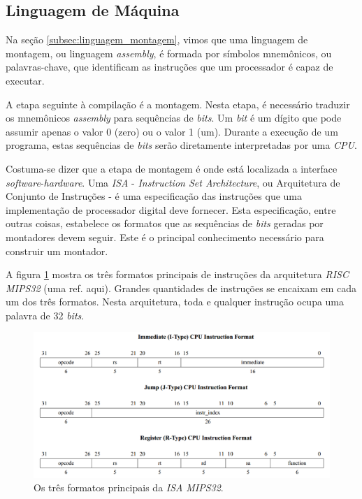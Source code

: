 \subsection{Linguagem de Máquina}
\label{subsec:linguagem_maquina}

Na seção \ref{subsec:linguagem_montagem}, vimos que uma linguagem de montagem,
ou linguagem \textit{assembly}, é formada por símbolos mnemônicos, ou
palavras-chave, que identificam as instruções que um processador é capaz de
executar.

A etapa seguinte à compilação é a montagem. Nesta etapa, é necessário traduzir
os mnemônicos \textit{assembly} para sequências de \textit{bits}. Um
\textit{bit} é um dígito que pode assumir apenas o valor 0 (zero) ou o valor 1
(um). Durante a execução de um programa, estas sequências de \textit{bits} serão
diretamente interpretadas por uma \textit{CPU}.

Costuma-se dizer que a etapa de montagem é onde está localizada a interface
\textit{software}-\textit{hardware}. Uma \textit{ISA} - \textit{Instruction Set
Architecture}, ou Arquitetura de Conjunto de Instruções - é uma especificação
das instruções que uma implementação de processador digital deve fornecer. Esta
especificação, entre outras coisas, estabelece os formatos que as sequências de
\textit{bits} geradas por montadores devem seguir. Este é o principal
conhecimento necessário para construir um montador.

A figura \ref{instrucoes_mips} mostra os três formatos principais de instruções
da arquitetura \textit{RISC} \textit{MIPS32} (uma ref. aqui). Grandes
quantidades de instruções se encaixam em cada um dos três formatos. Nesta
arquitetura, toda e qualquer instrução ocupa uma palavra de 32 \textit{bits}.

\begin{figure}[ptb]
  \begin{center}
    \includegraphics[scale=.35]{imagens/instrucoes_mips}
  \end{center}
  \caption{Os três formatos principais da \textit{ISA} \textit{MIPS32}.}
  \label{instrucoes_mips}
\end{figure}

